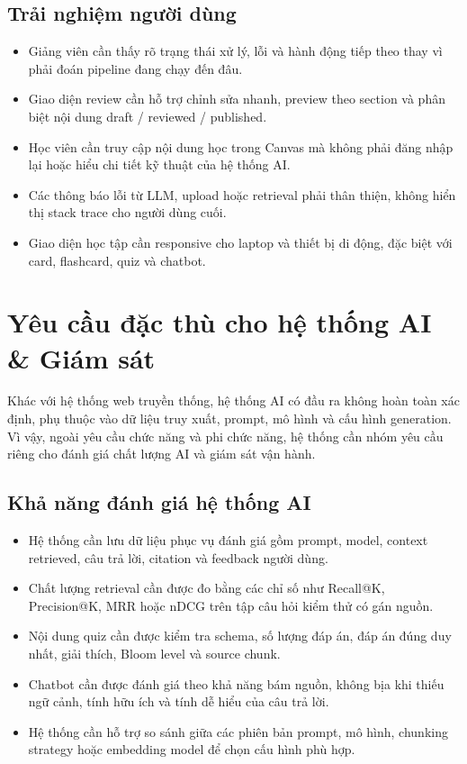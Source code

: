\subsection{Trải nghiệm người dùng}
\label{subsec:trai-nghiem-nguoi-dung}

\begin{itemize}
    \item Giảng viên cần thấy rõ trạng thái xử lý, lỗi và hành động tiếp theo
          thay vì phải đoán pipeline đang chạy đến đâu.
    \item Giao diện review cần hỗ trợ chỉnh sửa nhanh, preview theo section và
          phân biệt nội dung draft / reviewed / published.
    \item Học viên cần truy cập nội dung học trong Canvas mà không phải đăng
          nhập lại hoặc hiểu chi tiết kỹ thuật của hệ thống AI.
    \item Các thông báo lỗi từ LLM, upload hoặc retrieval phải thân thiện,
          không hiển thị stack trace cho người dùng cuối.
    \item Giao diện học tập cần responsive cho laptop và thiết bị di động, đặc
          biệt với card, flashcard, quiz và chatbot.
\end{itemize}

\section{Yêu cầu đặc thù cho hệ thống AI \& Giám sát}
\label{sec:yeu-cau-ai-giam-sat}

Khác với hệ thống web truyền thống, hệ thống AI có đầu ra không hoàn toàn xác
định, phụ thuộc vào dữ liệu truy xuất, prompt, mô hình và cấu hình generation.
Vì vậy, ngoài yêu cầu chức năng và phi chức năng, hệ thống cần nhóm yêu cầu
riêng cho đánh giá chất lượng AI và giám sát vận hành.

\subsection{Khả năng đánh giá hệ thống AI}
\label{subsec:kha-nang-danh-gia-he-thong-ai}

\begin{itemize}
    \item Hệ thống cần lưu dữ liệu phục vụ đánh giá gồm prompt, model, context
          retrieved, câu trả lời, citation và feedback người dùng.
    \item Chất lượng retrieval cần được đo bằng các chỉ số như Recall@K,
          Precision@K, MRR hoặc nDCG trên tập câu hỏi kiểm thử có gán nguồn.
    \item Nội dung quiz cần được kiểm tra schema, số lượng đáp án, đáp án đúng
          duy nhất, giải thích, Bloom level và source chunk.
    \item Chatbot cần được đánh giá theo khả năng bám nguồn, không bịa khi
          thiếu ngữ cảnh, tính hữu ích và tính dễ hiểu của câu trả lời.
    \item Hệ thống cần hỗ trợ so sánh giữa các phiên bản prompt, mô hình,
          chunking strategy hoặc embedding model để chọn cấu hình phù hợp.
\end{itemize}

